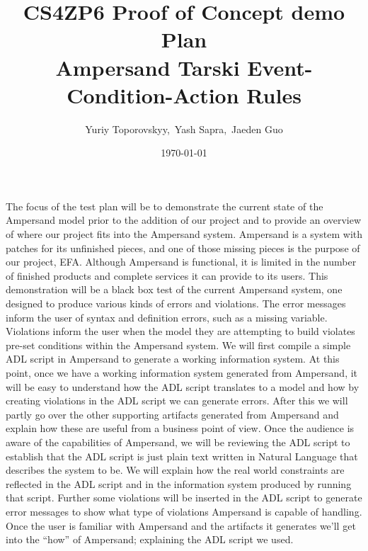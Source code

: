 \documentclass[12pt]{article}
\begin{document}
\title{CS4ZP6 Proof of Concept demo Plan \\ Ampersand Tarski Event-Condition-Action 
Rules \\ \vspace{2ex}} 
\author{\normalsize{Yuriy Toporovskyy,\ Yash Sapra,\ Jaeden Guo}}
\date{\normalsize\today \vspace{1ex}}
\thispagestyle{empty}
\maketitle
\paragraph{}
The focus of the test plan will be to demonstrate the current state of the 
Ampersand model prior to the addition of our project and to provide an overview 
of where our project fits into the Ampersand system. Ampersand is a system with 
patches for its unfinished pieces, and one of those missing pieces is the 
purpose of our project, EFA. Although Ampersand is functional, it is limited in 
the number of finished products and complete services it can provide to its 
users. This demonstration will be a black box test of the current Ampersand 
system, one designed to produce various kinds of errors and violations. The 
error messages inform the user of syntax and definition errors, such as a 
missing variable. Violations inform the user when the model they are attempting 
to build violates pre-set conditions within the Ampersand system. 
\newline\newline
\indent We will first compile a simple ADL script in Ampersand to generate a working
information system. At this point, once we have a working information system generated from Ampersand,
it will be easy to understand how the ADL script translates to a model and how by creating violations in the ADL script we can generate errors. After this we will partly go over the other supporting artifacts generated from Ampersand and explain how these are useful from a business point of view. 
Once the audience is aware of the capabilities of Ampersand, we will be reviewing 
the ADL script to establish that the ADL script is just plain text written in Natural Language that
 describes the system to be.
We will explain how the real world constraints are reflected in the ADL script and in the information system produced by running that script. Further some violations will be inserted in the ADL script to generate error messages to show what type of violations Ampersand is capable of handling. Once the user is familiar with Ampersand and the artifacts it generates we'll get into the ``how'' of  Ampersand; explaining the ADL script we used. 
 
\end{document}
